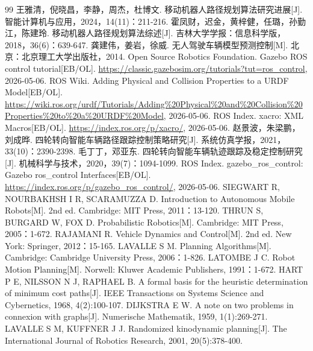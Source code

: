 \begin{thebibliography}{99}
 王雅清，倪晓昌，李静，周杰，杜博文. 移动机器人路径规划算法研究进展{[}J{]}. 智能计算机与应用，2024，14(11)：211-216.
 霍凤财，迟金，黄梓健，任璐，孙勤江，陈建玲. 移动机器人路径规划算法综述{[}J{]}. 吉林大学学报：信息科学版，2018，36(6)：639-647.
 龚建伟，姜岩，徐威. 无人驾驶车辆模型预测控制{[}M{]}. 北京：北京理工大学出版社，2014.
 Open Source Robotics Foundation. Gazebo ROS control tutorial{[}EB/OL{]}. \href{https://classic.gazebosim.org/tutorials?tut=ros_control}{https://classic.gazebosim.org/tutorials?tut=ros\_control}, 2026-05-06.
 ROS Wiki. Adding Physical and Collision Properties to a URDF Model{[}EB/OL{]}. \href{https://wiki.ros.org/urdf/Tutorials/Adding\%20Physical\%20and\%20Collision\%20Properties\%20to\%20a\%20URDF\%20Model}{https://wiki.ros.org/urdf/Tutorials/Adding\%20Physical\%20and\%20Collision\%20Properties\%20to\%20a\%20URDF\%20Model}, 2026-05-06.
 ROS Index. xacro: XML Macros{[}EB/OL{]}. \href{https://index.ros.org/p/xacro/}{https://index.ros.org/p/xacro/}, 2026-05-06.
 赵景波，朱梁鹏，刘成晔. 四轮转向智能车辆路径跟踪控制策略研究{[}J{]}. 系统仿真学报，2021，33(10)：2390-2398.
 毛丁丁，邓亚东. 四轮转向智能车辆轨迹跟踪及稳定控制研究{[}J{]}. 机械科学与技术，2020，39(7)：1094-1099.
 ROS Index. gazebo\_ros\_control: Gazebo ros\_control Interfaces{[}EB/OL{]}. \href{https://index.ros.org/p/gazebo_ros_control/}{https://index.ros.org/p/gazebo\_ros\_control/}, 2026-05-06.
 SIEGWART R, NOURBAKHSH I R, SCARAMUZZA D. Introduction to Autonomous Mobile Robots{[}M{]}. 2nd ed. Cambridge: MIT Press, 2011：13-120.
 THRUN S, BURGARD W, FOX D. Probabilistic Robotics{[}M{]}. Cambridge: MIT Press, 2005：1-672.
 RAJAMANI R. Vehicle Dynamics and Control{[}M{]}. 2nd ed. New York: Springer, 2012：15-165.
 LAVALLE S M. Planning Algorithms{[}M{]}. Cambridge: Cambridge University Press, 2006：1-826.
 LATOMBE J C. Robot Motion Planning{[}M{]}. Norwell: Kluwer Academic Publishers, 1991：1-672.
 HART P E, NILSSON N J, RAPHAEL B. A formal basis for the heuristic determination of minimum cost paths{[}J{]}. IEEE Transactions on Systems Science and Cybernetics, 1968, 4(2):100-107.
 DIJKSTRA E W. A note on two problems in connexion with graphs{[}J{]}. Numerische Mathematik, 1959, 1(1):269-271.
 LAVALLE S M, KUFFNER J J. Randomized kinodynamic planning{[}J{]}. The International Journal of Robotics Research, 2001, 20(5):378-400.

\end{thebibliography}
